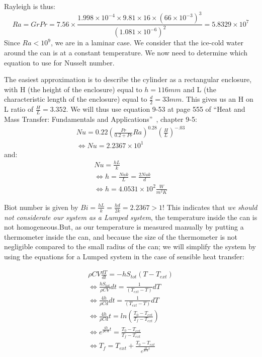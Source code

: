 \documentclass{report}
\begin{document}
	
	Rayleigh is thus: 
	\begin{equation}
		Ra = GrPr= 7.56\times \frac{1.998\times 10^{-4}\times 9.81\times 16\times (66\times 10^{-3})^3}{(1.081\times 10^{-6})^2}= 5.8329\times 10^{7}
	\end{equation}
	Since $Ra<10^9$, we are in a laminar case. We consider that the ice-cold water around the can is at a constant temperature. We now need to determine which equation to use for Nusselt number.
	
	The easiest approximation is to describe the cylinder as a rectangular enclosure, with H (the height of the enclosure) equal to $h=116mm$ and L (the characteristic length of the enclosure) equal to $\frac{d}{2}=33mm$. This gives us an H on L ratio of $\frac{H}{L}=3.352$. We will thus use equation 9-53 at page 555 of ``Heat and Mass Transfer: Fundamentals and Applications''~\cite{HaMT}, chapter 9-5:
	\begin{equation}
		\begin{gathered}
		Nu=0.22(\frac{Pr}{0.2+Pr}Ra)^{0.28}(\frac{H}{L})^{-.03}\\
		\Leftrightarrow Nu=2.2367\times 10^{1}
		\end{gathered}	
	\end{equation}
	and:
	\begin{equation}
		\begin{gathered}
		Nu=\frac{hL}{k}\\
		\Leftrightarrow h=\frac{Nu k}{L}=\frac{2Nu k}{d}\\
		\Leftrightarrow h=4.0531\times 10^2 \frac{W}{m^2K}
		\end{gathered}	
	\end{equation}
	
	Biot number is given by $Bi=\frac{hL}{k}=\frac{hd}{2k}=2.2367>1$! This indicates that \emph{we should not considerate our system as a Lumped system}, the temperature inside the can is not homogeneous.But, as our temperature is measured manually by putting a thermometer inside the can, and because the size of the thermometer is not negligible compared to the small radius of the can; we will simplify the system by using the equations for a Lumped system in the case of sensible heat transfer:
	
	\begin{equation}
		\begin{gathered}
		\rho CV\frac{dT}{dt}=-hS_{tot}(T-T_{ext})\\
		\Leftrightarrow \frac{hS_{tot}}{\rho CV}dt=\frac{1}{(T_{ext}-T)}dT\\
		\Leftrightarrow \frac{4h}{\rho Cd}dt=\frac{1}{(T_{ext}-T)}dT\\
		\Leftrightarrow \frac{4h}{\rho Cd}t=ln(\frac{T_0-T_{ext}}{T_f-T_{ext}})\\
		\Leftrightarrow e^{\frac{4h}{\rho Cd}t}=\frac{T_0-T_{ext}}{T_f-T_{ext}}\\
		\Leftrightarrow T_f=T_{ext}+\frac{T_0-T_{ext}}{e^{\frac{4h}{\rho Cd}t}}
		\end{gathered}
	\end{equation}
	
\end{document}
